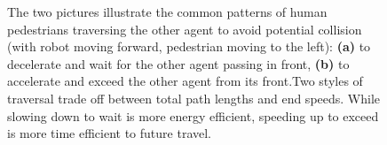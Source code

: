 \documentclass[conference]{IEEEtran}
\begin{document}
\begin{figure}[tb]
  \begin{center}
  \hspace*{-1em}
  \hspace*{-0.03em}
  \end{center}
  \vspace{-0.85em}
  \caption{The two pictures illustrate the common patterns of human 
    pedestrians traversing the other agent to avoid potential collision (with robot 
    moving forward, pedestrian moving to the left): {\bf (a)} to 
    decelerate and wait for the other agent passing in front, 
    {\bf (b)} to accelerate and exceed the other agent from its front.Two styles of traversal trade off between total path lengths and end speeds. While slowing down to wait is more energy efficient, speeding up to exceed is more time efficient to future travel. 
    }  
  \vspace{-0.5em}
\label{fig1}
\end{figure}
\end{document}
